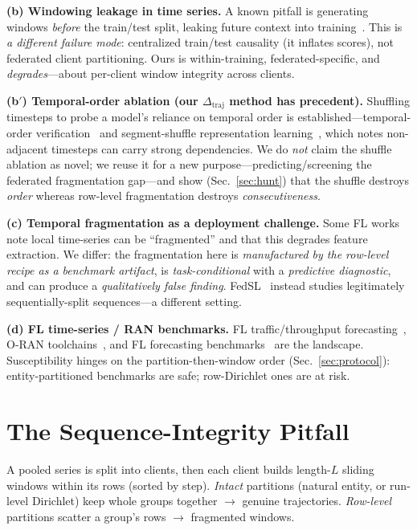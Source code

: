 \documentclass[conference]{IEEEtran}
\newcommand{\dtraj}{\Delta_{\mathrm{traj}}}
\begin{document}
\textbf{(b) Windowing leakage in time series.} A known pitfall is generating windows \emph{before} the
train/test split, leaking future context into training~\cite{HiddenLeaks2025}. This is \emph{a different
failure mode}: centralized train/test causality (it inflates scores), not federated client partitioning.
Ours is within-training, federated-specific, and \emph{degrades}---about per-client window integrity
across clients.

\textbf{(b$'$) Temporal-order ablation (our $\dtraj$ method has precedent).} Shuffling timesteps to probe
a model's reliance on temporal order is established---temporal-order verification~\cite{Misra2016_ShuffleLearn}
and segment-shuffle representation learning~\cite{Grover2024_S3}, which notes non-adjacent timesteps can
carry strong dependencies. We do \emph{not} claim the shuffle ablation as novel; we reuse it for a new
purpose---predicting/screening the federated fragmentation gap---and show (Sec.~\ref{sec:hunt}) that the
shuffle destroys \emph{order} whereas row-level fragmentation destroys \emph{consecutiveness}.

\textbf{(c) Temporal fragmentation as a deployment challenge.} Some FL works note local time-series can be
``fragmented'' and that this degrades feature extraction. We differ: the fragmentation here is
\emph{manufactured by the row-level recipe as a benchmark artifact}, is \emph{task-conditional} with a
\emph{predictive diagnostic}, and can produce a \emph{qualitatively false finding}.
FedSL~\cite{Abedi2020_FedSL} instead studies legitimately sequentially-split sequences---a different
setting.

\textbf{(d) FL time-series / RAN benchmarks.} FL traffic/throughput
forecasting~\cite{Pavlidis2024_FLMobile,Perifanis2023_5GTraffic,arXiv2508_08479}, O-RAN
toolchains~\cite{OpenRANGym2022,Polese2022,Twinning2024_dataset}, and FL forecasting
benchmarks~\cite{Hallak2025_FLForget} are the landscape. Susceptibility hinges on the partition-then-window
order (Sec.~\ref{sec:protocol}): entity-partitioned benchmarks are safe; row-Dirichlet ones are at risk.

\section{The Sequence-Integrity Pitfall}\label{sec:pitfall}
A pooled series is split into clients, then each client builds length-$L$ sliding windows within its rows
(sorted by step). \emph{Intact} partitions (natural entity, or run-level Dirichlet) keep whole groups
together $\rightarrow$ genuine trajectories. \emph{Row-level} partitions scatter a group's rows
$\rightarrow$ fragmented windows.
\end{document}
